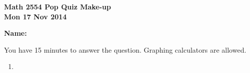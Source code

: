 \documentclass[11pt,letterpaper]{article}
\begin{document}
\flushleft
\begin{multicols}{2}

\begin{large}\textbf{Math 2554 Pop Quiz Make-up \\
Mon 17 Nov 2014}\end{large}

\hfill\textbf{Name:  }\underline{\hspace{40ex}} %

\vspace{.5in}

\end{multicols}

\pagestyle{empty}

\flushleft

You have 15 minutes to answer the question.  Graphing calculators are allowed.  

\begin{enumerate}

\item 

\end{enumerate}
\end{document}

